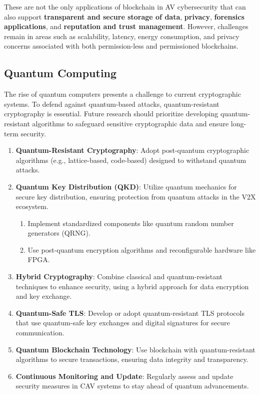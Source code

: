 These are not the only applications of blockchain in AV cybersecurity that can also support \textbf{transparent and secure storage of data},
\textbf{privacy}, \textbf{forensics applications}, and \textbf{reputation and trust management}.
However, challenges remain in areas such as scalability, latency, energy consumption,
and privacy concerns
associated with both permission-less and permissioned blockchains\cite{bendiab2023autonomous, giannaros2023autonomous, khan2020cyber, admass2023cyber, ahmad2023machine}.

\subsection{Quantum Computing}\label{subsec:quantum-computing}
The rise of quantum computers presents a challenge to current cryptographic systems.
To defend against quantum-based attacks, quantum-resistant cryptography is essential.
Future research should prioritize
developing quantum-resistant algorithms to safeguard sensitive cryptographic data and ensure long-term security\cite{ahmad2023machine, admass2023cyber}.

\begin{enumerate}
    \item \textbf{Quantum-Resistant Cryptography}:
    Adopt post-quantum cryptographic algorithms (e.g., lattice-based, code-based) designed to withstand quantum attacks.
    \item \textbf{Quantum Key Distribution (QKD)}: Utilize quantum mechanics for secure key distribution,
    ensuring protection from quantum attacks in the V2X ecosystem.
    \begin{enumerate}
        \item Implement standardized components like quantum random number generators (QRNG).
        \item Use post-quantum encryption algorithms and reconfigurable hardware like FPGA.
    \end{enumerate}
    \item \textbf{Hybrid Cryptography}: Combine classical and quantum-resistant techniques to enhance security,
    using a hybrid approach for data encryption and key exchange.
    \item \textbf{Quantum-Safe TLS}:
    Develop or adopt quantum-resistant TLS protocols
    that use quantum-safe key exchanges and digital signatures for secure communication.
    \item \textbf{Quantum Blockchain Technology}: Use blockchain with quantum-resistant algorithms to secure transactions,
    ensuring data integrity and transparency.
    \item \textbf{Continuous Monitoring and Update}:
    Regularly assess and update security measures in CAV systems to stay ahead of quantum advancements.
\end{enumerate}

